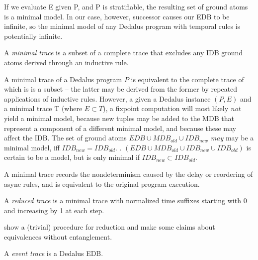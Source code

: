 
If we evaluate E given P, and P is stratifiable, the resulting set of ground atoms is a minimal model.
In our case, however, successor causes our EDB to be infinite, so the minimal model of any Dedalus program 
with temporal rules is potentially infinite.  


\begin{definition}
A \emph{minimal trace} is a subset of a complete trace that excludes any IDB ground atoms derived through an inductive
rule.
\end{definition}

A minimal trace of a Dedalus program $P$ is equivalent to the complete trace of which is is a subset -- the latter may be derived from the former by repeated
applications of inductive rules.  However, a given a Dedalus instance $(P, E)$ and a minimal trace T (where $E \subset T$), a fixpoint
computation will most likely \emph{not} yield a minimal model, because new tuples may be added to the MDB that represent a component 
of a different minimal model, and because these may affect the IDB.  The set of ground atoms $EDB \cup MDB_{old} \cup IDB_{new}$
\emph{may} may be a minimal model, iff $IDB_{new} = IDB_{old}$.  .  
$(EDB \cup MDB_{old} \cup IDB_{new} \cup IDB_{old})$ is certain to be a model, but is only minimal if $IDB_{new} \subset IDB_{old}$.

A minimal trace records the nondeterminism caused by the delay or reordering of async rules, and
is equivalent to the original program execution.  

\begin{definition}
A \emph{reduced trace} is a minimal trace with normalized time suffixes starting with 0 and increasing by 1 at each step.
\end{definition}

show a (trivial) procedure for reduction and make some claims about equivalences without entanglement.

\begin{definition}
A \emph{event trace} is a Dedalus EDB.
\end{definition}


